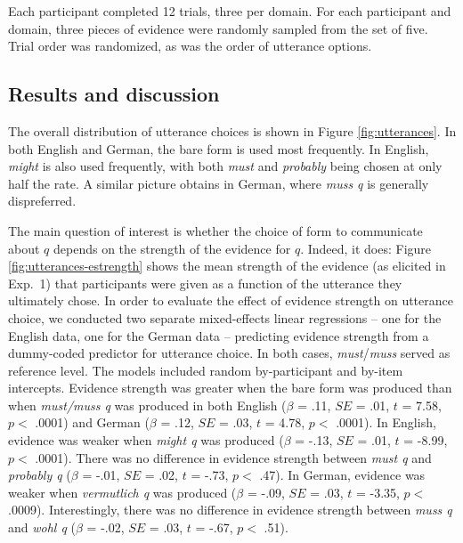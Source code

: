 \documentclass[11pt]{article}
\newcommand{\figref}[1]{Figure \ref{#1}}
\begin{document}
Each participant completed 12 trials, three per domain. For each participant and domain, three pieces of evidence were randomly sampled from the set of five. Trial order was randomized, as was the order of utterance options.


\subsection{Results and discussion}

The overall distribution of utterance choices is shown in \figref{fig:utterances}. In both English and German, the bare form is used most frequently. In English, \emph{might} is also used frequently, with both \emph{must} and \emph{probably} being chosen at only half the rate. A similar picture obtains in German, where \emph{muss q} is generally dispreferred.

The main question of interest  is whether the choice of form to communicate about $q$ depends on the strength of the evidence for $q$. Indeed, it does: \figref{fig:utterances-estrength} shows the mean strength of the evidence (as elicited in Exp.~1) that participants were given as a function of the utterance they ultimately chose.   In order to evaluate the effect of evidence strength on utterance choice, we conducted two separate mixed-effects linear regressions -- one for the English data, one for the German data -- predicting evidence strength from a dummy-coded predictor for utterance choice. In both cases, \emph{must}/\emph{muss} served as reference level. The models included random by-participant and by-item  intercepts. Evidence strength was greater when the bare form was produced than when \emph{must/muss q} was produced in both English ($\beta$ = .11, $SE$ = .01, $t$ = 7.58, $p <$ .0001) and German ($\beta$ = .12, $SE$ = .03, $t$ = 4.78, $p <$ .0001). In English, evidence   was weaker  when \emph{might q} was produced  ($\beta$ = -.13, $SE$ = .01, $t$ = -8.99, $p <$ .0001). There was no difference in evidence strength between \emph{must q} and \emph{probably q}  ($\beta$ = -.01, $SE$ = .02, $t$ = -.73, $p <$ .47). In German, evidence was weaker when \emph{vermutlich q} was produced  ($\beta$ = -.09, $SE$ = .03, $t$ = -3.35, $p <$ .0009). Interestingly, there was no difference in evidence strength between \emph{muss q} and \emph{wohl q}  ($\beta$ = -.02, $SE$ = .03, $t$ = -.67, $p <$ .51).
\end{document}
